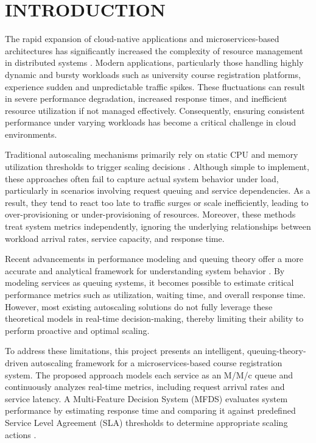 \chapter{INTRODUCTION}

\begingroup
{}
\sloppy

The rapid expansion of cloud-native applications and microservices-based architectures has significantly increased the complexity of resource management in distributed systems \cite{khaleq2021, fourati2021}. Modern applications, particularly those handling highly dynamic and bursty workloads such as university course registration platforms, experience sudden and unpredictable traffic spikes. These fluctuations can result in severe performance degradation, increased response times, and inefficient resource utilization if not managed effectively. Consequently, ensuring consistent performance under varying workloads has become a critical challenge in cloud environments.

Traditional autoscaling mechanisms primarily rely on static CPU and memory utilization thresholds to trigger scaling decisions \cite{khaleq2021}. Although simple to implement, these approaches often fail to capture actual system behavior under load, particularly in scenarios involving request queuing and service dependencies. As a result, they tend to react too late to traffic surges or scale inefficiently, leading to over-provisioning or under-provisioning of resources. Moreover, these methods treat system metrics independently, ignoring the underlying relationships between workload arrival rates, service capacity, and response time.

Recent advancements in performance modeling and queuing theory offer a more accurate and analytical framework for understanding system behavior \cite{wang2024}. By modeling services as queuing systems, it becomes possible to estimate critical performance metrics such as utilization, waiting time, and overall response time. However, most existing autoscaling solutions do not fully leverage these theoretical models in real-time decision-making, thereby limiting their ability to perform proactive and optimal scaling.

To address these limitations, this project presents an intelligent, queuing-theory-driven autoscaling framework for a microservices-based course registration system. The proposed approach models each service as an M/M/c queue and continuously analyzes real-time metrics, including request arrival rates and service latency. A Multi-Feature Decision System (MFDS) evaluates system performance by estimating response time and comparing it against predefined Service Level Agreement (SLA) thresholds to determine appropriate scaling actions \cite{lai2025}.

